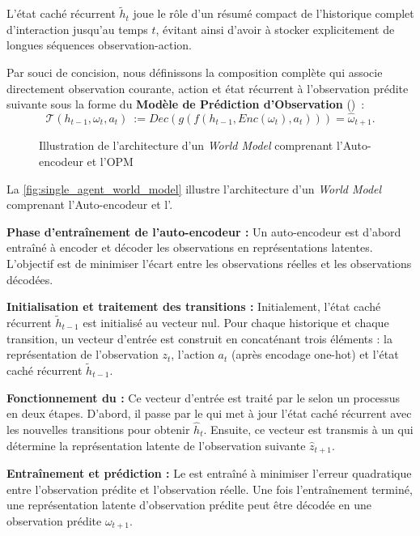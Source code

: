 L'état caché récurrent $\tilde{h}_t$ joue le rôle d'un résumé compact de l'historique complet d'interaction jusqu'au temps $t$, évitant ainsi d'avoir à stocker explicitement de longues séquences observation-action.

Par souci de concision, nous définissons la composition complète qui associe directement observation courante, action et état récurrent à l'observation prédite suivante sous la forme du \textbf{Modèle de Prédiction d'Observation} ()~:
\[
  \mathcal{T}(h_{t-1}, \omega_t, a_t)~:= Dec(g(f(h_{t-1}, Enc(\omega_t), a_t))) = \hat{\omega}_{t+1}.
\]

\begin{figure}[h!]
  \centering
  \resizebox{\textwidth}{!}{%
    
  }
  \caption{Illustration de l'architecture d'un \textit{World Model} comprenant l'Auto-encodeur et l'OPM}
  \label{fig:single_agent_world_model}
\end{figure}

La \autoref{fig:single_agent_world_model} illustre l'architecture d'un \textit{World Model} comprenant l'Auto-encodeur et l'.

\textbf{Phase d'entraînement de l'auto-encodeur :} Un auto-encodeur est d'abord entraîné à encoder et décoder les observations en représentations latentes. L'objectif est de minimiser l'écart entre les observations réelles et les observations décodées.

\textbf{Initialisation et traitement des transitions :} Initialement, l'état caché récurrent $\tilde{h}_{t-1}$ est initialisé au vecteur nul. Pour chaque historique et chaque transition, un vecteur d'entrée est construit en concaténant trois éléments : la représentation de l'observation $z_t$, l'action $a_t$ (après encodage one-hot) et l'état caché récurrent $\tilde{h}_{t-1}$.

\textbf{Fonctionnement du  :} Ce vecteur d'entrée est traité par le  selon un processus en deux étapes. D'abord, il passe par le  qui met à jour l'état caché récurrent avec les nouvelles transitions pour obtenir $\hat{h}_t$. Ensuite, ce vecteur est transmis à un  qui détermine la représentation latente de l'observation suivante $\hat{z}_{t+1}$.

\textbf{Entraînement et prédiction :} Le  est entraîné à minimiser l'erreur quadratique entre l'observation prédite et l'observation réelle. Une fois l'entraînement terminé, une représentation latente d'observation prédite peut être décodée en une observation prédite $\omega_{t+1}$.

